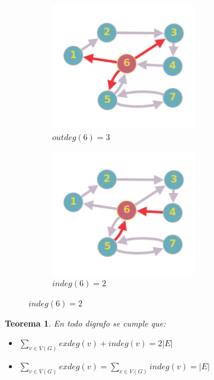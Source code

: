 \documentclass[a4paper,1pt]{report}
\newtheorem*{teo}{Teorema}
\begin{document}
\begin{figure}[H]
    \centering
    \begin{subfigure}[b]{0.45\textwidth}
        \centering
        \includegraphics[width=0.7\textwidth]{figures8/outdeg.png}
        \caption{$outdeg(6) = 3$}
    \end{subfigure} 
        \begin{subfigure}[b]{0.45\textwidth}
        \centering
        \includegraphics[width=0.7\textwidth]{figures8/indeg.png}
        \caption{$indeg(6) = 2$}
         \end{subfigure} 
\end{figure} 

\begin{teo}
 En todo digrafo se cumple que:
 \begin{itemize}
  \item $\sum_{v \in V(G)}exdeg(v)+indeg(v)=2|E|$
  \item $\sum_{v \in V(G)}exdeg(v)=\sum_{v \in V(G)}indeg(v)=|E|$
 \end{itemize}

\end{teo}
\end{document}
